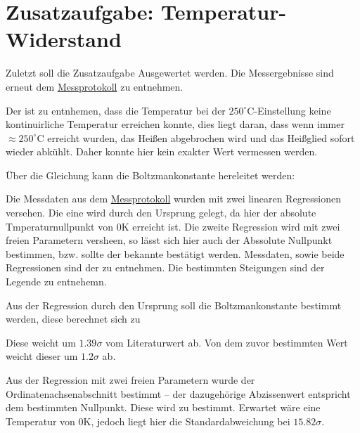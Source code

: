\section{Zusatzaufgabe: Temperatur-Widerstand}
\label{sec:A4}
Zuletzt soll die Zusatzaufgabe Ausgewertet werden. Die Messergebnisse sind erneut dem \hyperref[ch:Protokoll]{Messprotokoll} zu entnehmen. 

Der  ist zu entnhemen, dass die Temperatur bei der $250^\circ$C-Einstellung keine kontinuirliche Temperatur erreichen konnte, dies liegt daran, dass wenn immer $\approx 250^\circ$C erreicht wurden, das Heißen abgebrochen wird und das Heißglied sofort wieder abkühlt. Daher konnte hier kein exakter Wert vermessen werden.

Über die Gleichung 
kann die Boltzmankonstante hereleitet werden:

Die Messdaten aus dem \hyperref[ch:Protokoll]{Messprotokoll} wurden mit zwei linearen Regressionen versehen. Die eine wird durch den Ursprung gelegt, da hier der absolute Tmperaturnullpunkt von 0K erreicht ist. Die zweite Regression wird mit zwei freien Parametern versheen, so lässt sich hier auch der Abssolute Nullpunkt bestimmen, bzw. sollte der bekannte bestätigt werden. Messdaten, sowie beide Regressionen sind der  zu entnehmen. Die bestimmten Steigungen sind der Legende zu entnehemn.

Aus der Regression durch den Ursprung soll die Boltzmankonstante bestimmt werden, diese berechnet sich zu 

Diese weicht um $1.39\sigma$ vom Literaturwert ab. Von dem zuvor bestimmten Wert weicht dieser um $1.2\sigma$ ab.

Aus der Regression mit zwei freien Parametern wurde der Ordinatenachsenabschnitt bestimmt -- der dazugehörige Abzissenwert entspricht dem bestimmten Nullpunkt. Diese wird zu 
bestimmt.
Erwartet wäre eine Temperatur von $0$K, jedoch liegt hier die Standardabweichung bei $15.82\sigma$. 
